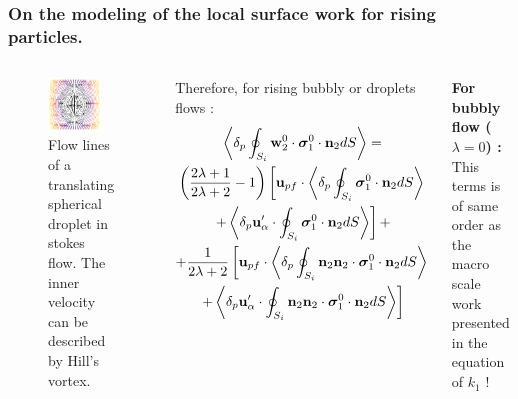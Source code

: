 \documentclass{sintefbeamer}
\begin{document}
\begin{frame}
  \frametitle{On the modeling of the local surface work for rising particles. }

  \begin{columns}
    \begin{figure}
      \includegraphics[width=0.8\textwidth]{image/Rising_Stokes.png}
      \caption{Flow lines of a translating spherical droplet in stokes flow.
      The inner velocity can be described by Hill's vortex.}
    \end{figure}

    Therefore, for rising bubbly or droplets flows : 
    \begin{multline*}
    \left<\delta_p \oint_{S_{i}} \textbf{w}_2^0 \cdot \bm{\sigma}_1^0\cdot\textbf{n}_2 dS\right>
    =  \\
    \left(\frac{2\lambda + 1}{2\lambda+2} - 1\right)\left[
        \textbf{u}_{p f}\cdot\left<\delta_p \oint_{S_{i}}  \bm{\sigma}_1^0\cdot\textbf{n}_2 dS\right>\right.\\ \left.
        + \left<\delta_p \textbf{u}_{\alpha}' \cdot \oint_{S_{i}}  \bm{\sigma}_1^0\cdot\textbf{n}_2 dS \right>
    \right]
    + \\
    + \frac{1}{2\lambda+2}\left[
        \textbf{u}_{p f} \cdot\left<\delta_p \oint_{S_{i}} \textbf{n}_2\textbf{n}_2\cdot \bm{\sigma}_1^0\cdot\textbf{n}_2 dS\right>\right.\\ \left.
        +
        \left<\delta_p \textbf{u}_{\alpha}' \cdot \oint_{S_{i}} \textbf{n}_2\textbf{n}_2\cdot \bm{\sigma}_1^0\cdot\textbf{n}_2 dS\right>
    \right]
\end{multline*}

\textbf{For bubbly flow ($\lambda = 0$) :}
This terms is of same order as the macro scale work presented in the equation of $k_1$ !


\end{columns}

\end{frame}
\end{document}
